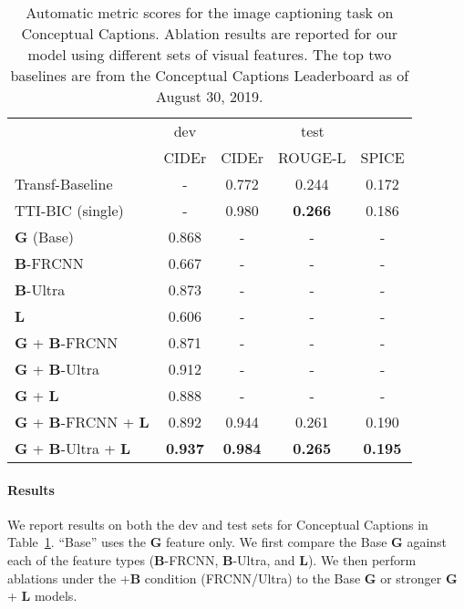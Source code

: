 \documentclass[11pt,a4paper]{article}
\begin{document}
\begin{table}[t]
\small
\begin{center}
\begin{tabular}{l|c|c|c|c}
& dev & \multicolumn{3}{c}{test} \\ \cline{2-5}
& {\scriptsize CIDEr} & {\scriptsize CIDEr} & {\scriptsize ROUGE-L} & {\scriptsize SPICE} \\ \hline
Transf-Baseline   & - & 0.772 & 0.244 & 0.172\\
TTI-BIC (single)       & - & 0.980 & \textbf{0.266} & 0.186\\ \hline \hline
{\bf G} (Base)      & 0.868 & - & - & -\\ \hline
{\bf B}-FRCNN & 0.667 & - & - & -\\
{\bf B}-Ultra & 0.873 & - & - & -\\
{\bf L} & 0.606 & - & - & -\\ \hline
{\bf G} + {\bf B}-FRCNN          & 0.871 & - & - & - \\
{\bf G} + {\bf B}-Ultra & 0.912 & - & - & - \\ \hline
{\bf G} + {\bf L}     & 0.888 & - & - & -\\ \hline
{\bf G} + {\bf B}-FRCNN + {\bf L} & 0.892 & 0.944 & 0.261 & 0.190 \\
{\bf G} + {\bf B}-Ultra + {\bf L} & \textbf{0.937} & \textbf{0.984} & \textbf{0.265} & \textbf{0.195} \\ \hline
\end{tabular}
\vspace{-7pt}
\caption {Automatic metric scores for the image captioning task on Conceptual Captions.
Ablation results are reported for our model using different sets of visual features.
The top two baselines are from the Conceptual Captions Leaderboard as of August 30, 2019.}
\vspace{-15pt}
\label{tab:result-cap}
\end{center}
\end{table}

 
\paragraph{Results}

We report results on both the dev and test sets for Conceptual Captions in Table~\ref{tab:result-cap}.
``Base'' uses the {\bf G} feature only.
We first compare the Base {\bf G} against each of the feature types ({\bf B}-FRCNN, {\bf B}-Ultra, and {\bf L}).
We then perform ablations under the +{\bf B} condition (FRCNN/Ultra) to the Base {\bf G} or stronger {\bf G} + {\bf L} models.
\end{document}
